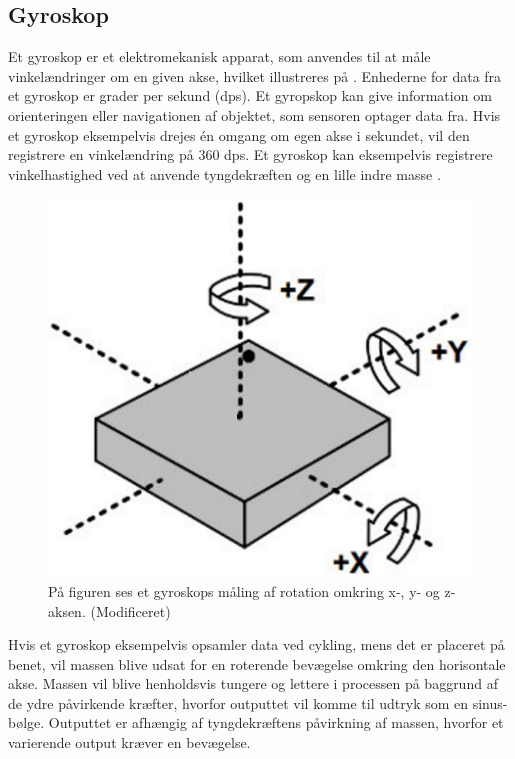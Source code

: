\subsection{Gyroskop}
Et gyroskop er et elektromekanisk apparat, som anvendes til at måle vinkelændringer om en given akse, hvilket illustreres på . Enhederne for data fra et gyroskop er grader per sekund (dps). Et gyropskop kan give information om orienteringen eller navigationen af objektet, som sensoren optager data fra. Hvis et gyroskop eksempelvis drejes én omgang om egen akse i sekundet, vil den registrere en vinkelændring på 360 dps. \citep{Sparkfun_gyro,Barbour2014} \newline
Et gyroskop kan eksempelvis registrere vinkelhastighed ved at anvende tyngdekræften og en lille indre masse \citep{Sparkfun_gyro,Barbour2014}.
\begin{figure}[H]
	\centering
	\includegraphics[scale=0.6]{figures/bProblemloesning/gyro.png}
	\caption{På figuren ses et gyroskops måling af rotation omkring x-, y- og z-aksen. \citep{Sparkfun_gyro} (Modificeret)}
	\label{fig:gyro}
\end{figure}\vspace{-.2cm}
Hvis et gyroskop eksempelvis opsamler data ved cykling, mens det er placeret på benet, vil massen blive udsat for en roterende bevægelse omkring den horisontale akse. Massen vil blive henholdsvis tungere og lettere i processen på baggrund af de ydre påvirkende kræfter, hvorfor outputtet vil komme til udtryk som en sinus-bølge. Outputtet er afhængig af tyngdekræftens påvirkning af massen, hvorfor et varierende output kræver en bevægelse. \citep{TittertonWeston2004,LuingeVeltink2005}
